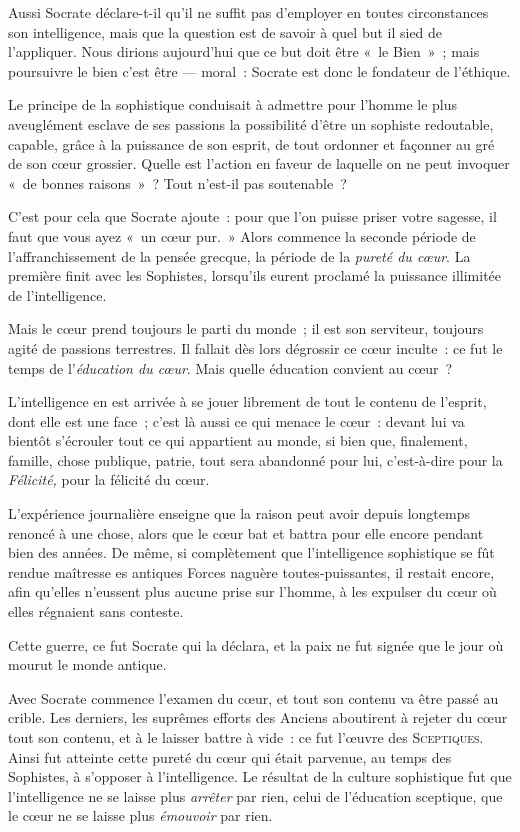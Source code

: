 \documentclass[french,twoside]{book} %
\begin{document}
Aussi Socrate déclare-t-il qu’il ne suffit pas d’employer en toutes circonstances son intelligence, mais que la question est de savoir à quel but il sied de l’appliquer. Nous dirions aujourd’hui que ce but doit être « le Bien » ; mais poursuivre le bien c’est être — moral : Socrate est donc le fondateur de l’éthique.\par
Le principe de la sophistique conduisait à admettre pour l’homme le plus aveuglément esclave de ses passions la possibilité d’être un sophiste redoutable, capable, grâce à la puissance de son esprit, de tout ordonner et façonner au gré de son cœur grossier. Quelle est l’action en faveur de laquelle on ne peut invoquer « de bonnes raisons » ? Tout n’est-il pas soutenable ?\par
 C’est pour cela que Socrate ajoute : pour que l’on puisse priser votre sagesse, il faut que vous ayez « un cœur pur. » Alors commence la seconde période de l’affranchissement de la pensée grecque, la période de la \emph{pureté du cœur}. La première finit avec les Sophistes, lorsqu’ils eurent proclamé la puissance illimitée de l’intelligence.\par
Mais le cœur prend toujours le parti du monde ; il est son serviteur, toujours agité de passions terrestres. Il fallait dès lors dégrossir ce cœur inculte : ce fut le temps de l’\emph{éducation du cœur}. Mais quelle éducation convient au cœur ?\par
L’intelligence en est arrivée à se jouer librement de tout le contenu de l’esprit, dont elle est une face ; c’est là aussi ce qui menace le cœur : devant lui va bientôt s’écrouler tout ce qui appartient au monde, si bien que, finalement, famille, chose publique, patrie, tout sera abandonné pour lui, c’est-à-dire pour la \emph{Félicité,} pour la félicité du cœur.\par
L’expérience journalière enseigne que la raison peut avoir depuis longtemps renoncé à une chose, alors que le cœur bat et battra pour elle encore pendant bien des années. De même, si complètement que l’intelligence sophistique se fût rendue maîtresse es antiques Forces naguère toutes-puissantes, il restait encore, afin qu’elles n’eussent plus aucune prise sur l’homme, à les expulser du cœur où elles régnaient sans conteste.\par
Cette guerre, ce fut Socrate qui la déclara, et la paix ne fut signée que le jour où mourut le monde antique.\par
Avec Socrate commence l’examen du cœur, et tout son contenu va être passé au crible. Les derniers, les suprêmes efforts des Anciens aboutirent à rejeter du cœur tout son contenu, et à le laisser battre à vide : ce fut l’œuvre des S{\scshape ceptiques}. Ainsi fut atteinte cette pureté du cœur qui était parvenue, au temps des Sophistes, à s’opposer à l’intelligence.  Le résultat de la culture sophistique fut que l’intelligence ne se laisse plus \emph{arrêter} par rien, celui de l’éducation sceptique, que le cœur ne se laisse plus \emph{émouvoir} par rien.\par
\end{document}
